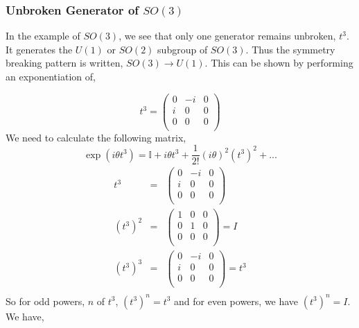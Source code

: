 \subsubsection{Unbroken Generator of $SO(3)$}
In the example of $SO(3)$, we see that only one generator remains unbroken, $t^3$. It generates the $U(1)$ or $SO(2)$ subgroup of $SO(3)$. Thus the symmetry breaking pattern is written, $SO(3)\rightarrow U(1)$. This can be shown by performing an exponentiation of, 

\begin{equation*}
    t^3 =
\begin{pmatrix}
0 & -i & 0\\
i & 0 & 0\\
0 & 0 & 0\\
\end{pmatrix}
\end{equation*}
We need to calculate the following matrix,
\begin{equation}
    \exp(i\theta t^3) = \mathbb{I} + i\theta t^3 + \frac{1}{2!}(i\theta)^2\left(t^3\right)^2 + ...
\end{equation}
\begin{eqnarray*}
    t^3 &=&
\begin{pmatrix}
0 & -i & 0\\
i & 0 & 0\\
0 & 0 & 0\\
\end{pmatrix}\\     
(t^3)^2 &=&
\begin{pmatrix}
1 & 0 & 0\\
0 & 1 & 0\\
0 & 0 & 0\\
\end{pmatrix}=I\\
(t^3)^3 &=&
\begin{pmatrix}
0 & -i & 0\\
i & 0 & 0\\
0 & 0 & 0\\
\end{pmatrix} = t^3\\
\end{eqnarray*}
So for odd powers, $n$ of $t^3$, $(t^3)^n = t^3$ and for even powers, we have $(t^3)^n = I$. We have, 
